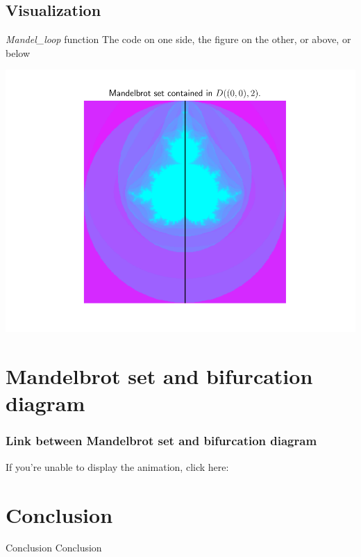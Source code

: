 \documentclass[11pt, compress]{beamer}
\theoremstyle{definition}
\begin{document}
\subsection{Visualization}
\begin{frame}{\emph{Mandel\_loop } function}
The code on one side, the figure on the other, or above, or below


\begin{center}
    \includegraphics[scale=0.55]{mandelbrot.pdf}
\end{center}
\end{frame}




\section[Link]{Mandelbrot set and bifurcation diagram}

\begin{frame}
\frametitle{Link between Mandelbrot set and bifurcation diagram}
If you're unable to display the animation, click here:
\href{https://www.youtube.com/watch?v=xYQbqML1eE4}{}


\end{frame}

\section[]{Conclusion}
\begin{frame}{Conclusion}
Conclusion
\end{frame}      
\end{document}

